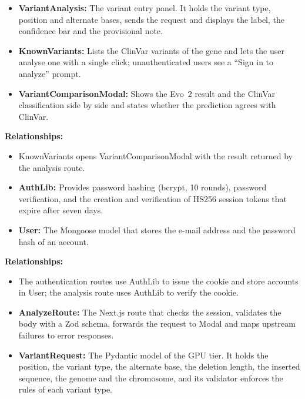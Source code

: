 \begin{itemize}
\item \textbf{VariantAnalysis:} The variant entry panel. It holds the variant type, position and alternate bases, sends the request and displays the label, the confidence bar and the provisional note.
\item \textbf{KnownVariants:} Lists the ClinVar variants of the gene and lets the user analyse one with a single click; unauthenticated users see a ``Sign in to analyze'' prompt.
\item \textbf{VariantComparisonModal:} Shows the Evo~2 result and the ClinVar classification side by side and states whether the prediction agrees with ClinVar.
\end{itemize}
\textbf{Relationships:}
\begin{itemize}
\item KnownVariants opens VariantComparisonModal with the result returned by the analysis route.
\end{itemize}

\begin{itemize}
\item \textbf{AuthLib:} Provides password hashing (bcrypt, 10 rounds), password verification, and the creation and verification of HS256 session tokens that expire after seven days.
\item \textbf{User:} The Mongoose model that stores the e-mail address and the password hash of an account.
\end{itemize}
\textbf{Relationships:}
\begin{itemize}
\item The authentication routes use AuthLib to issue the cookie and store accounts in User; the analysis route uses AuthLib to verify the cookie.
\end{itemize}

\begin{itemize}
\item \textbf{AnalyzeRoute:} The Next.js route that checks the session, validates the body with a Zod schema, forwards the request to Modal and maps upstream failures to error responses.
\item \textbf{VariantRequest:} The Pydantic model of the GPU tier. It holds the position, the variant type, the alternate base, the deletion length, the inserted sequence, the genome and the chromosome, and its validator enforces the rules of each variant type.
\end{itemize}

